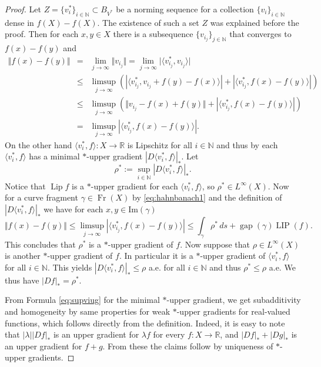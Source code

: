 \documentclass{amsart}
\numberwithin{equation}{section}
\newcommand{\R}{\mathbb{R}}
\newcommand{\N}{\mathbb{N}}
\newcommand{\Lip}{\operatorname{Lip}}
\newcommand{\LIP}{\operatorname{LIP}}
\newcommand{\gap}{\operatorname{gap}}
\newcommand{\Fr}{\operatorname{Fr}}
\begin{document}
\begin{proof}
   Let $Z=\{ v_i^*\}_{i\in\N}\subset B_{V^*}$ be a norming sequence for a collection $\{ v_i\}_{i\in\N}$ dense in $f(X)-f(X)$. The existence of such a set $Z$ was explained before the proof.  Then for each $x,y\in X$ there is a subsequence $\{ v_{i_j}\}_{j\in\N}$ that converges to $f(x)-f(y)$ and
    \begin{eqnarray}
\Vert f(x)-f(y)\Vert &=&\lim_{j\to\infty }\Vert v_{i_j}\Vert =\lim_{j\to\infty }\vert\langle v_{i_j}^*,v_{i_j}\rangle\vert \nonumber \\
&\leq & \limsup_{j\to\infty }\left(\left\vert \langle v_{i_j}^*,v_{i_j}+f(y)-f(x)\rangle\right\vert +\left\vert \langle v_{i_j}^*,f(x)-f(y)\rangle\right\vert\right)\nonumber \\
&\leq &\limsup_{j\to\infty }\left( \Vert v_{i_j}-f(x)+f(y)\Vert+\left\vert \langle v_{i_j}^*,f(x)-f(y)\rangle\right\vert\right)\nonumber \\
&=&\limsup_{j\to\infty}\left\vert \langle v_{i_j}^*,f(x)-f(y)\rangle\right\vert  \label{eq:hahnbanach1}.
\end{eqnarray}
    On the other hand $\langle v_i^*,f\rangle :X\rightarrow \R$ is Lipschitz for all $i\in\N$ and thus by \cite[Proposition 2.10]{tsd24} each $\langle v_i^*,f\rangle$ has a minimal $*$-upper gradient $|D\langle v_i^*,f\rangle|_*$. Let
    \begin{equation}\label{eq:supviug}
        \rho^*:=\sup_{i\in\N} |D\langle v_i^*,f\rangle|_*.
    \end{equation}
    Notice that $\Lip f$ is a $*$-upper gradient for each $\langle v_i^*,f\rangle$, so $\rho^*\in L^\infty (X)$. Now for a curve fragment $\gamma\in \Fr (X)$ by \eqref{eq:hahnbanach1} and the definition of $|D\langle v_i^*,f\rangle|_*$
     we have for each $x,y\in \mathrm{Im} (\gamma )$
     $$ \Vert f(x)-f(y)\Vert \leq \limsup_{j\to\infty}\left\vert \langle v_{i_j}^*,f(x)-f(y)\rangle\right\vert \leq \int_\gamma \rho^* \, ds +\gap (\gamma )\LIP (f).$$
     This concludes that $\rho^*$ is a $*$-upper gradient of $f$. Now suppose that $\rho\in L^\infty (X)$ is another $*$-upper gradient of $f$. In particular it is a $*$-upper gradient of $\langle v_i^*,f\rangle$ for all $i\in\N$. This yields $|D\langle v_i^*,f\rangle|_*\leq \rho$ a.e. for all $i\in\N$ and thus $\rho^*\leq \rho$ a.e. We thus have $|Df|_*=\rho^*$.

     From Formula \eqref{eq:supviug} for the minimal $\ast$-upper gradient, we get subadditivity and homogeneity by same properties for weak $\ast$-upper gradients for real-valued functions, which follows directly from the definition. Indeed, it is easy to note that $|\lambda||Df|_\ast$ is an upper gradient for $\lambda f$ for every $f:X\to \R$, and $|Df|_\ast + |Dg|_\ast$ is an upper gradient for $f+g$. From these the claims follow by uniqueness of $\ast$-upper gradients.

     \end{proof}
\end{document}

